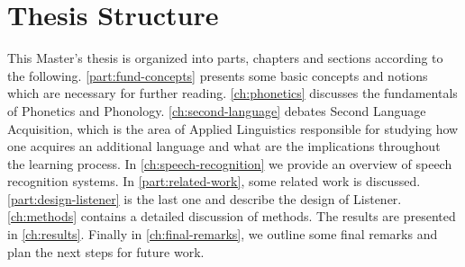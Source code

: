 \section{Thesis Structure}

This Master's thesis is organized into parts, chapters and sections according to the following.
\autoref{part:fund-concepts} presents some basic concepts and notions which are necessary for further reading. \autoref{ch:phonetics} discusses the fundamentals of Phonetics and Phonology. \autoref{ch:second-language} debates Second Language Acquisition, which is the area of Applied Linguistics responsible for studying how one acquires an additional language and what are the implications throughout the learning process. In \autoref{ch:speech-recognition} we provide an overview of speech recognition systems. In \autoref{part:related-work}, some related work is discussed. \autoref{part:design-listener} is the last one and describe the design of Listener. \autoref{ch:methods} contains a detailed discussion of methods. The results are presented in \autoref{ch:results}. Finally in \autoref{ch:final-remarks}, we outline some final remarks and plan the next steps for future work.